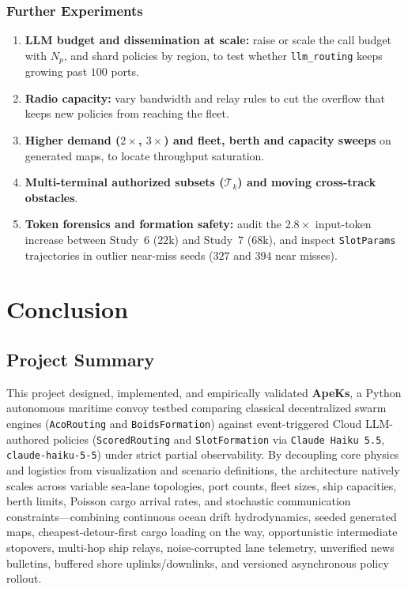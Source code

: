 \documentclass[11pt,a4paper,oneside]{report}
\begin{document}
\subsection{Further Experiments}
\begin{enumerate}
    \item \textbf{LLM budget and dissemination at scale:} raise or scale the call budget with $N_p$, and shard policies by region, to test whether \texttt{llm\_routing} keeps growing past $100$ ports.
    \item \textbf{Radio capacity:} vary bandwidth and relay rules to cut the overflow that keeps new policies from reaching the fleet.
    \item \textbf{Higher demand ($2\times$, $3\times$) and fleet, berth and capacity sweeps} on generated maps, to locate throughput saturation.
    \item \textbf{Multi-terminal authorized subsets ($\mathcal{T}_k$) and moving cross-track obstacles}.
    \item \textbf{Token forensics and formation safety:} audit the $2.8\times$ input-token increase between Study~6 ($22\text{k}$) and Study~7 ($68\text{k}$), and inspect \texttt{SlotParams} trajectories in outlier near-miss seeds ($327$ and $394$ near misses).
\end{enumerate}

\chapter[Conclusion]{Conclusion}
\label{cp:Conclusion}

\parindent0pt

\section{Project Summary}
This project designed, implemented, and empirically validated \textbf{ApeKs}, a Python autonomous maritime convoy testbed comparing classical decentralized swarm engines (\texttt{AcoRouting} and \texttt{BoidsFormation}) against event-triggered Cloud LLM-authored policies (\texttt{ScoredRouting} and \texttt{SlotFormation} via \texttt{Claude Haiku 5.5}, \texttt{claude-haiku-5-5}) under strict partial observability. By decoupling core physics and logistics from visualization and scenario definitions, the architecture natively scales across variable sea-lane topologies, port counts, fleet sizes, ship capacities, berth limits, Poisson cargo arrival rates, and stochastic communication constraints---combining continuous ocean drift hydrodynamics, seeded generated maps, cheapest-detour-first cargo loading on the way, opportunistic intermediate stopovers, multi-hop ship relays, noise-corrupted lane telemetry, unverified news bulletins, buffered shore uplinks/downlinks, and versioned asynchronous policy rollout.
\end{document}
